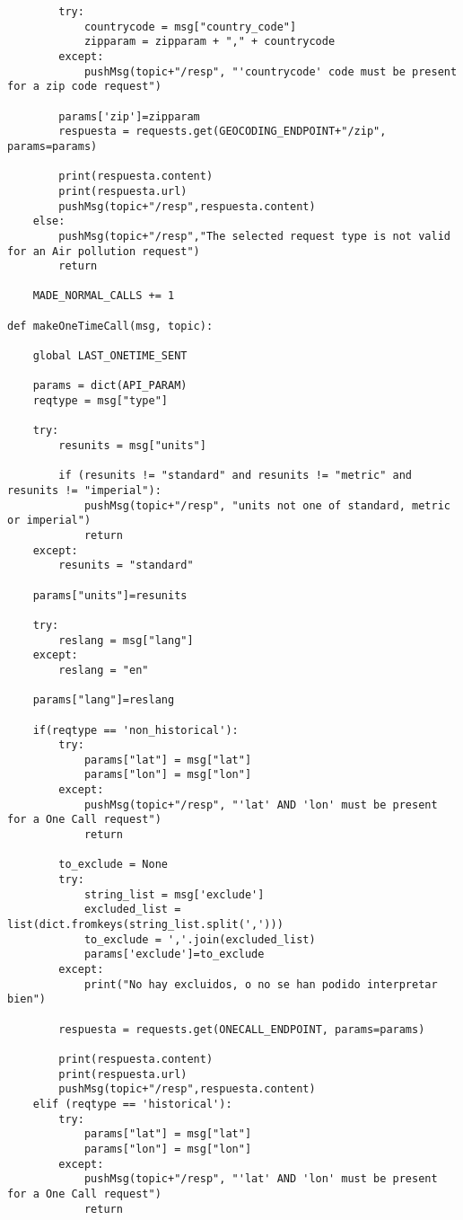 \documentclass{scrbook}
\begin{document}
{\begin{verbatim}
        try:
            countrycode = msg["country_code"]
            zipparam = zipparam + "," + countrycode
        except:
            pushMsg(topic+"/resp", "'countrycode' code must be present for a zip code request")
            
        params['zip']=zipparam
        respuesta = requests.get(GEOCODING_ENDPOINT+"/zip", params=params)

        print(respuesta.content)
        print(respuesta.url)
        pushMsg(topic+"/resp",respuesta.content)
    else:
        pushMsg(topic+"/resp","The selected request type is not valid for an Air pollution request")
        return

    MADE_NORMAL_CALLS += 1

def makeOneTimeCall(msg, topic):

    global LAST_ONETIME_SENT

    params = dict(API_PARAM)
    reqtype = msg["type"]

    try:
        resunits = msg["units"]

        if (resunits != "standard" and resunits != "metric" and resunits != "imperial"):
            pushMsg(topic+"/resp", "units not one of standard, metric or imperial")
            return
    except:
        resunits = "standard"

    params["units"]=resunits

    try:
        reslang = msg["lang"]
    except:
        reslang = "en"

    params["lang"]=reslang

    if(reqtype == 'non_historical'):
        try:
            params["lat"] = msg["lat"]
            params["lon"] = msg["lon"]
        except:
            pushMsg(topic+"/resp", "'lat' AND 'lon' must be present for a One Call request")
            return

        to_exclude = None
        try:
            string_list = msg['exclude']
            excluded_list = list(dict.fromkeys(string_list.split(',')))
            to_exclude = ','.join(excluded_list)
            params['exclude']=to_exclude
        except:
            print("No hay excluidos, o no se han podido interpretar bien")

        respuesta = requests.get(ONECALL_ENDPOINT, params=params)

        print(respuesta.content)
        print(respuesta.url)
        pushMsg(topic+"/resp",respuesta.content)
    elif (reqtype == 'historical'):
        try:
            params["lat"] = msg["lat"]
            params["lon"] = msg["lon"]
        except:
            pushMsg(topic+"/resp", "'lat' AND 'lon' must be present for a One Call request")
            return


\end{verbatim}}
\end{document}
